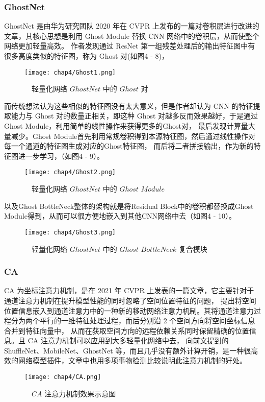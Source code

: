 \subsubsection{GhostNet}
GhostNet 是由华为研究团队 2020 年在 CVPR 上发布的一篇对卷积层进行改进的文章，其核心思想是利用 Ghost Module 替换 CNN 网络中的卷积层，从而使整个网络更加轻量高效。
作者发现通过 ResNet 第一组残差处理后的输出特征图中有很多高度类似的特征图，称为 Ghost 对(如图4 - 8)，
\vspace{3mm}
\begin{figure}[htbp]
	\centering
	\texttt{[image: chap4/Ghost1.png]}
	\caption{\ \ 轻量化网络 $GhostNet$ 中的 $Ghost$ 对}
	\label{fig4-8}
\end{figure}
\vspace{3mm}
而传统想法认为这些相似的特征图没有太大意义，但是作者却认为 CNN 的特征提取能力与 Ghost 对的数量正相关，即这种 Ghost 对越多反而效果越好，于是通过 Ghost Module，利用简单的线性操作来获得更多的Ghost对，
最后发现计算量大量减少。Ghost Module首先利用常规卷积得到本源特征图，然后通过线性操作对每一个通道的特征图生成对应的Ghost特征图，
而后将二者拼接输出，作为新的特征图进一步学习，（如图4 - 9）。
\vspace{3mm}
\begin{figure}[htbp]
	\centering
	\texttt{[image: chap4/Ghost2.png]}
	\caption{\ \ 轻量化网络 $GhostNet$ 中的 $Ghost$ $Module$}
	\label{fig4-9}
\end{figure}
\vspace{3mm}

以及Ghost BottleNeck整体的架构就是将Residual Block中的卷积都替换成Ghost Module得到，从而可以很方便地嵌入到其他CNN网络中去（如图4 - 10）。
\vspace{3mm}
\begin{figure}[htbp]
	\centering
	\texttt{[image: chap4/Ghost3.png]}
	\caption{\ \ 轻量化网络 $GhostNet$ 中的 $Ghost$ $BottleNeck$ 复合模块}
	\label{fig4-10}
\end{figure}


\subsubsection{CA}
CA 为坐标注意力机制，是在 2021 年 CVPR 上发表的一篇文章，它主要针对于通道注意力机制在提升模型性能的同时忽略了空间位置特征的问题，
提出将空间位置信息嵌入到通道注意力中的一种新的移动网络注意力机制。其将通道注意力过程分为两个平行的一维特征处理过程，而后分别沿 2 个空间方向将空间坐标信息合并到特征向量中，
从而在获取空间方向的远程依赖关系同时保留精确的位置信息。且 CA 注意力机制可以应用到大多轻量化网络中去，
向前文提到的 ShuffleNet、MobileNet、GhostNet 等，而且几乎没有额外计算开销，是一种很高效的网络模型插件，文章中也用多项事物检测比较说明此注意力机制的好处。
\begin{figure}[htbp]
	\centering
	\texttt{[image: chap4/CA.png]}
	\caption{\ \ $CA$ 注意力机制效果示意图}
	\label{fig4-11}
\end{figure}


